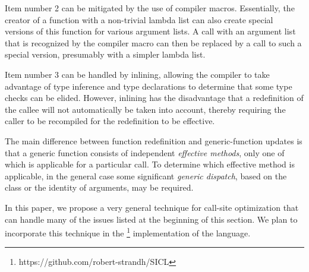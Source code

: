 Item number 2 can be mitigated by the use of compiler macros.
Essentially, the creator of a function with a non-trivial lambda list
can also create special versions of this function for various argument
lists.  A call with an argument list that is recognized by the
compiler macro can then be replaced by a call to such a special
version, presumably with a simpler lambda list.

Item number 3 can be handled by inlining, allowing the compiler to
take advantage of type inference and type declarations to determine
that some type checks can be elided.  However, inlining has the
disadvantage that a redefinition of the callee will not automatically
be taken into account, thereby requiring the caller to be recompiled for
the redefinition to be effective.

The main difference between function redefinition and generic-function
updates is that a generic function consists of independent
\emph{effective methods}, only one of which is applicable for a
particular call.  To determine which effective method is applicable,
in the general case some significant \emph{generic dispatch}, based on
the class or the identity of arguments, may be required.

In this paper, we propose a very general technique for call-site
optimization that can handle many of the issues listed at the
beginning of this section.  We plan to incorporate this technique in
the \sicl{}%
\footnote{https://github.com/robert-strandh/SICL}
implementation of the \commonlisp{} language.

